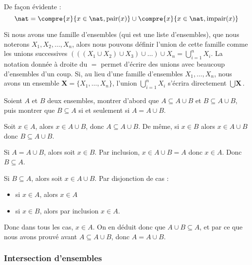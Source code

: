 \begin{expl}
    De façon évidente :
    $$\nat=\compre{x}{x\in\nat, \mathrm{pair}(x)}\cup\compre{x}{x\in\nat,\mathrm{impair}(x)}$$
\end{expl}



\begin{rmk}
    Si nous avons une famille d'ensembles (qui est une liste d'ensembles), que nous noterons $X_1,X_2,\ldots,X_n$, alors nous pouvons définir l'union de cette famille comme les unions successives $\displaystyle{(((X_1\cup X_2)\cup X_3)\cup\ldots)\cup X_n=\bigcup_{i=1}^n X_i}$. La notation donnée à droite du $=$ permet d'écrire des unions avec beaucoup d'ensembles d'un coup. Si, au lieu d'une famille d'ensembles $X_1,\ldots, X_n$, nous avons un ensemble $\textbf{X}=\{X_1,\ldots,X_n\}$, l'union $\displaystyle{\bigcup_{i=1}^n X_i}$ s'écrira directement $\displaystyle{\bigcup \textbf{X}}$.
\end{rmk}

\begin{exo}
    Soient $A$ et $B$ deux ensembles, montrer d'abord que $A\subseteq A\cup B$ et $B\subseteq A\cup B$, puis montrer que $B\subseteq A$ si et seulement si $A=A\cup B$.
\end{exo}
\begin{correction}
    Soit $x\in A$, alors $x\in A \cup B$, donc $A\subseteq A\cup B$. De même, si $x\in B$ alors $x\in A \cup B$ donc $B\subseteq A \cup B$.
    
    Si $A=A\cup B$, alors soit $x\in B$. Par inclusion, $x\in A \cup B= A$ donc $x\in A$. Donc $B\subseteq A$.
    
    Si $B\subseteq A$, alors soit $x\in A\cup B$. Par disjonction de cas :
    \begin{itemize}[label=$\bullet$]
        \item si $x\in A$, alors $x\in A$
        \item si $x\in B$, alors par inclusion $x\in A$.
    \end{itemize}
    Donc dans tous les cas, $x\in A$. On en déduit donc que $A\cup B \subseteq A$, et par ce que nous avons prouvé avant $A\subseteq A\cup B$, donc $A=A\cup B$.
\end{correction}

\subsubsection{Intersection d'ensembles}

